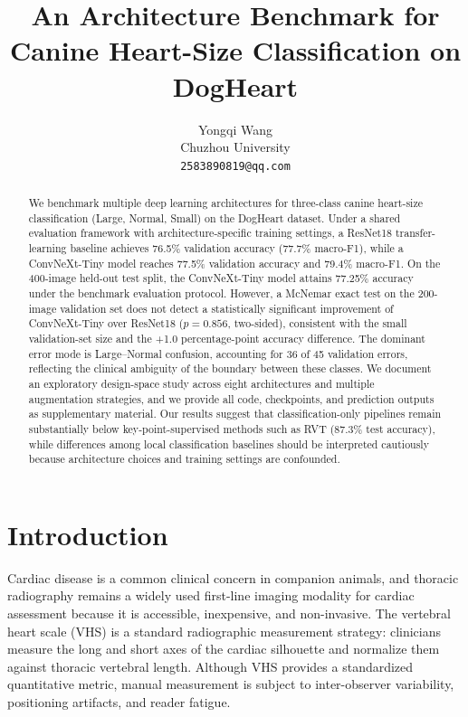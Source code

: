 \documentclass[10pt,twocolumn,letterpaper]{article}
\newcommand{\BestAccuracy}{77.5\%}
\newcommand{\BestTestAccuracy}{77.25\%}
\newcommand{\BestMacroFOne}{79.4\%}
\newcommand{\BaselineAccuracy}{76.5\%}
\newcommand{\BaselineMacroFOne}{77.7\%}
\newcommand{\McNemarBaselineP}{0.856}
\begin{document}
\title{An Architecture Benchmark for Canine Heart-Size Classification on DogHeart}

\author{Yongqi Wang\\
Chuzhou University\\
{\tt\small 2583890819@qq.com}
}

\maketitle

\begin{abstract}
We benchmark multiple deep learning architectures for three-class canine heart-size classification (Large, Normal, Small) on the DogHeart dataset. Under a shared evaluation framework with architecture-specific training settings, a ResNet18 transfer-learning baseline achieves \BaselineAccuracy{} validation accuracy (\BaselineMacroFOne{} macro-F1), while a ConvNeXt-Tiny model reaches \BestAccuracy{} validation accuracy and \BestMacroFOne{} macro-F1. On the 400-image held-out test split, the ConvNeXt-Tiny model attains \BestTestAccuracy{} accuracy under the benchmark evaluation protocol. However, a McNemar exact test on the 200-image validation set does not detect a statistically significant improvement of ConvNeXt-Tiny over ResNet18 ($p = \McNemarBaselineP$, two-sided), consistent with the small validation-set size and the +1.0 percentage-point accuracy difference. The dominant error mode is Large--Normal confusion, accounting for 36 of 45 validation errors, reflecting the clinical ambiguity of the boundary between these classes. We document an exploratory design-space study across eight architectures and multiple augmentation strategies, and we provide all code, checkpoints, and prediction outputs as supplementary material. Our results suggest that classification-only pipelines remain substantially below key-point-supervised methods such as RVT (87.3\% test accuracy), while differences among local classification baselines should be interpreted cautiously because architecture choices and training settings are confounded.
\end{abstract}

\section{Introduction}\label{sec:intro}

Cardiac disease is a common clinical concern in companion animals, and thoracic radiography remains a widely used first-line imaging modality for cardiac assessment because it is accessible, inexpensive, and non-invasive. The vertebral heart scale (VHS) is a standard radiographic measurement strategy: clinicians measure the long and short axes of the cardiac silhouette and normalize them against thoracic vertebral length. Although VHS provides a standardized quantitative metric, manual measurement is subject to inter-observer variability, positioning artifacts, and reader fatigue.
\end{document}
